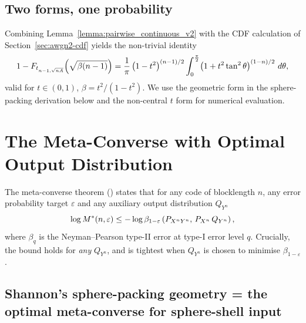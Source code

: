 \subsection{Two forms, one probability}

Combining Lemma~\ref{lemma:pairwise_continuous_v2} with the CDF calculation of Section~\ref{sec:awgn2-cdf} yields the non-trivial identity
\begin{equation}\label{eq:awgn2-two-forms}
	1 - F_{t_{n-1,\sqrt{nA}}}\!\left( \sqrt{\beta(n-1)} \right)
	= \frac{1}{\pi}\left( 1-t^2 \right)^{(n-1)/2} \int_{0}^{\frac \pi 2}\!\left( 1+t^2 \tan^2\theta \right)^{(1-n)/2}\,d\theta,
\end{equation}
valid for $t\in(0,1)$, $\beta = t^2/(1-t^2)$.  We use the geometric form in the sphere-packing derivation below and the non-central $t$ form for numerical evaluation.

\section{The Meta-Converse with Optimal Output Distribution}
\label{sec:awgn2-meta}

The meta-converse theorem (\cite[Theorem~26]{polyanskiy2010channel}) states that for any code of blocklength $n$, any error probability target $\varepsilon$ and any auxiliary output distribution $Q_{Y^n}$
\begin{equation}\label{eq:awgn2-metaconv}
	\log M^*(n, \varepsilon) \leq -\log \beta_{1-\varepsilon}\left( P_{X^n Y^n}, \, P_{X^n}\, Q_{Y^n} \right),
\end{equation}
where $\beta_q$ is the Neyman--Pearson type-II error at type-I error level $q$.  Crucially, the bound holds for \emph{any} $Q_{Y^n}$, and is tightest when $Q_{Y^n}$ is chosen to minimise $\beta_{1-\varepsilon}$.

\subsection{Shannon's sphere-packing geometry = the optimal meta-converse for sphere-shell input}

